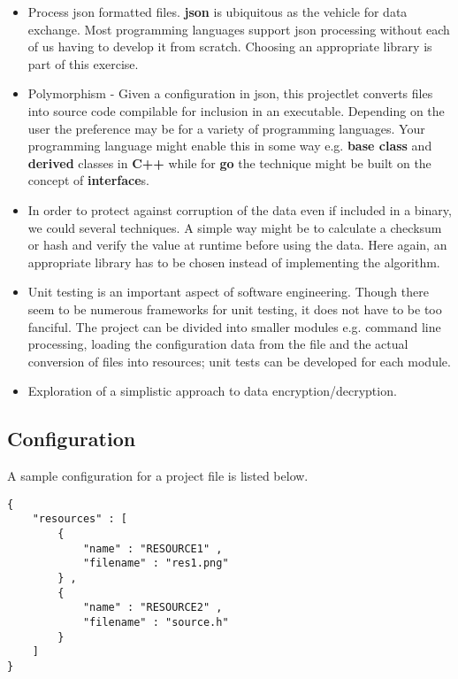 \documentclass[12pt, a4paper]{article} %
\begin{document}
\begin{itemize}
    \item Process json formatted files. \textbf{json} is ubiquitous as the vehicle for data exchange. Most programming languages support json processing without each of us having to develop it from scratch. Choosing an appropriate library is part of this exercise.
    \item Polymorphism - Given a configuration in json, this projectlet converts files into source code compilable for inclusion in an executable. Depending on the user the preference may be for a variety of programming languages. Your programming language might enable this in some way e.g. \textbf{base class} and \textbf{derived} classes in \textbf{C++} while for \textbf{go} the technique might be built on the concept of \textbf{interface}s.
    \item In order to protect against corruption of the data even if included in a binary, we could several techniques. A simple way might be to calculate a checksum or hash and verify the value at runtime before using the data. Here again, an appropriate library has to be chosen instead of implementing the algorithm.
    \item Unit testing is an important aspect of software engineering. Though there seem to be numerous frameworks for unit testing, it does not have to be too fanciful. The project can be divided into smaller modules e.g. command line processing, loading the configuration data from the file and the actual conversion of files into resources; unit tests can be developed for each module.
    \item Exploration of a simplistic approach to data encryption/decryption.
\end{itemize}

\subsection{Configuration}

A sample configuration for a project file is listed below.

\begin{lstlisting}[caption=Example config.json]
{
    "resources" : [
        {
            "name" : "RESOURCE1" ,
            "filename" : "res1.png"
        } ,
        {
            "name" : "RESOURCE2" ,
            "filename" : "source.h"
        }
    ]
}

\end{lstlisting}
\end{document}
